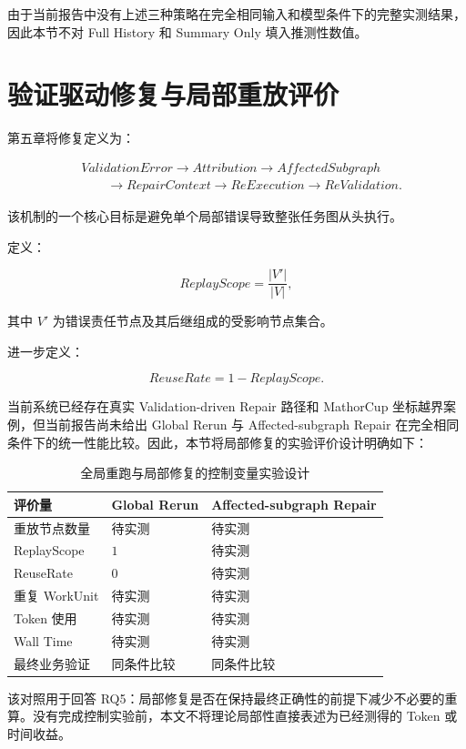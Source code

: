 \documentclass[UTF8,a4paper,12pt,oneside]{ctexbook}
\begin{document}
由于当前报告中没有上述三种策略在完全相同输入和模型条件下的完整实测结果，因此本节不对 Full History 和 Summary Only 填入推测性数值。


\section{验证驱动修复与局部重放评价}

第五章将修复定义为：

\[
\begin{aligned}
&ValidationError
\rightarrow Attribution
\rightarrow AffectedSubgraph \\[3pt]
&\qquad\rightarrow RepairContext
\rightarrow ReExecution
\rightarrow ReValidation.
\end{aligned}
\]

该机制的一个核心目标是避免单个局部错误导致整张任务图从头执行。

定义：

\[
ReplayScope
=
\frac{|V'|}{|V|},
\]

其中 $V'$ 为错误责任节点及其后继组成的受影响节点集合。

进一步定义：

\[
ReuseRate
=
1-ReplayScope.
\]

当前系统已经存在真实 Validation-driven Repair 路径和 MathorCup 坐标越界案例，但当前报告尚未给出 Global Rerun 与 Affected-subgraph Repair 在完全相同条件下的统一性能比较。因此，本节将局部修复的实验评价设计明确如下：

\begin{table}[htbp]
\centering
\caption{全局重跑与局部修复的控制变量实验设计}
\label{tab:repair-ablation}
\begin{tabularx}{0.96\textwidth}{p{}X X}
\toprule
评价量 & Global Rerun & Affected-subgraph Repair\\
\midrule
重放节点数量 & 待实测 & 待实测\\
ReplayScope & $1$ & 待实测\\
ReuseRate & $0$ & 待实测\\
重复 WorkUnit & 待实测 & 待实测\\
Token 使用 & 待实测 & 待实测\\
Wall Time & 待实测 & 待实测\\
最终业务验证 & 同条件比较 & 同条件比较\\
\bottomrule
\end{tabularx}
\end{table}

该对照用于回答 RQ5：局部修复是否在保持最终正确性的前提下减少不必要的重算。没有完成控制实验前，本文不将理论局部性直接表述为已经测得的 Token 或时间收益。
\end{document}
